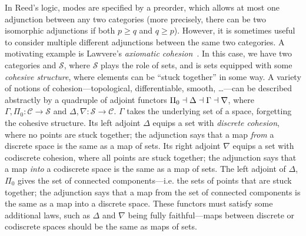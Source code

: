 \documentclass{drl-common/llncs}
\begin{document}
In Reed's logic, modes are specified by a preorder, which allows at most
one adjunction between any two categories (more precisely, there can be
two isomorphic adjunctions if both $p \ge q$ and $q \ge p$).  However,
it is sometimes useful to consider multiple different adjunctions
between the same two categories.  A motivating example is Lawvere's
\emph{axiomatic cohesion}~\citep{lawvereXXcohesion}.  In this case, we
have two categories \C and $\mathcal{S}$, where $\mathcal{S}$ plays the
role of sets, and \C is sets equipped with some \emph{cohesive
  structure}, where elements can be ``stuck together'' in some way.  A
variety of notions of cohesion---topological, differentiable, smooth,
\ldots---can be described abstractly by a quadruple of adjoint functors
$\Pi_0 \dashv \Delta \dashv \Gamma \dashv \nabla$, where $\Gamma,\Pi_0 :
\mathcal{C} \to \mathcal{S}$ and $\Delta,\nabla : \mathcal{S} \to
\mathcal{C}$.  $\Gamma$ takes the underlying set of a space, forgetting
the cohesive structure.  Its left adjoint $\Delta$ equips a set with
\emph{discrete cohesion}, where no points are stuck together; the
adjunction says that a map \emph{from} a discrete space is the same as a
map of sets.  Its right adjoint $\nabla$ equips a set with codiscrete
cohesion, where all points are stuck together; the adjunction says that
a map \emph{into} a codiscrete space is the same as a map of sets.  The
left adjoint of $\Delta$, $\Pi_0$ gives the set of connected
components---i.e. the sets of points that are stuck together; the
adjunction says that a map from the set of connected components is the
same as a map into a discrete space.  These functors must satisfy some
additional laws, such as $\Delta$ and $\nabla$ being fully
faithful---maps between discrete or codiscrete spaces should be the same
as maps of sets.
\end{document}

